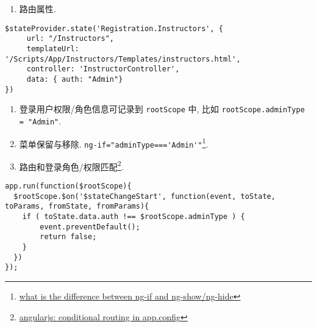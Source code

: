 \begin{enumerate}
\def\labelenumi{\arabic{enumi}.}
\tightlist
\item
  路由属性.
\end{enumerate}

\begin{lstlisting}
$stateProvider.state('Registration.Instructors', {
     url: "/Instructors",
     templateUrl: '/Scripts/App/Instructors/Templates/instructors.html',
     controller: 'InstructorController',
     data: { auth: "Admin"}
})
\end{lstlisting}

\begin{enumerate}
\def\labelenumi{\arabic{enumi}.}
\setcounter{enumi}{1}
\tightlist
\item
  登录用户权限/角色信息可记录到 \lstinline!rootScope! 中, 比如
  \lstinline!rootScope.adminType = "Admin"!.
\item
  菜单保留与移除. \lstinline!ng-if="adminType==='Admin'"!\footnote{\href{http://stackoverflow.com/questions/19177732/what-is-the-difference-between-ng-if-and-ng-show-ng-hide}{what
    is the difference between ng-if and ng-show/ng-hide}}.
\item
  路由和登录角色/权限匹配\footnote{\href{http://stackoverflow.com/questions/20978248/angularjs-conditional-routing-in-app-config}{angularjs:
    conditional routing in app.config}}.
\end{enumerate}

\begin{lstlisting}
app.run(function($rootScope){
  $rootScope.$on('$stateChangeStart', function(event, toState, toParams, fromState, fromParams){
    if ( toState.data.auth !== $rootScope.adminType ) {
        event.preventDefault();
        return false;
    }
  })
});
\end{lstlisting}

